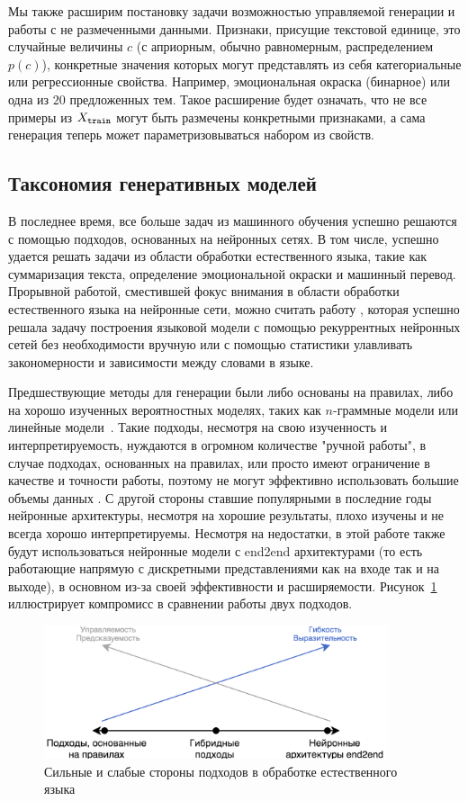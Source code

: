 \documentclass{spbau-diploma}
\begin{document}
Мы также расширим постановку задачи возможностью управляемой генерации и работы
с не размеченными данными. Признаки, присущие текстовой единице, это случайные 
величины $c$ (с априорным, обычно равномерным, распределением $p(c)$), 
конкретные значения которых могут представлять из себя категориальные 
или регрессионные свойства. Например, эмоциональная окраска (бинарное) или одна 
из $20$ предложенных тем. 
Такое расширение будет означать, что не все примеры из $X_{\texttt{train}}$ могут быть 
размечены конкретными признаками, а сама генерация теперь может 
параметризовываться набором из свойств.

\subsection{Таксономия генеративных моделей}
В последнее время, все больше задач из машинного обучения успешно решаются с 
помощью подходов, основанных на нейронных сетях. В том числе, успешно удается
решать задачи из области обработки естественного языка, такие как суммаризация
текста, определение эмоциональной окраски и машинный перевод. Прорывной работой,
сместившей фокус внимания в области обработки естественного языка на нейронные
сети, можно считать работу \cite{rnnlm}, которая успешно решала
задачу построения языковой модели с помощью рекуррентных нейронных сетей без
необходимости вручную или с помощью статистики улавливать закономерности и 
зависимости между словами в языке.

Предшествующие методы для генерации были либо 
основаны на правилах, либо на хорошо изученных вероятностных моделях, таких как
$n$-граммные модели или линейные модели~\cite{statmodel1, statmodel2}. 
Такие подходы,
несмотря на свою изученность и интерпретируемость, нуждаются в огромном 
количестве "ручной работы", в случае подходах, основанных на правилах, или 
просто имеют ограничение в качестве и точности работы, поэтому не могут 
эффективно использовать большие объемы данных \cite{1602.02410}. 
С другой стороны ставшие популярными в 
последние годы нейронные архитектуры, несмотря на хорошие результаты, плохо 
изучены и не всегда хорошо интерпретируемы. Несмотря на недостатки, в этой 
работе также будут использоваться нейронные модели с end2end архитектурами (то 
есть работающие напрямую с дискретными представлениями как на входе так 
и на выходе), в основном из-за своей эффективности и расширяемости.
Рисунок~\ref{approaches} иллюстрирует компромисс в сравнении работы двух 
подходов.

\begin{figure}[H]
\centering
\includegraphics[width=0.9\textwidth]{images/approaches.png}
\caption{Сильные и слабые стороны подходов в обработке естественного языка}
\label{approaches}
\end{figure}
\end{document}
